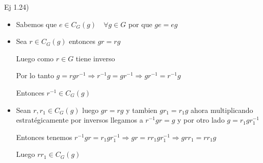\documentclass[12pt]{article}
\begin{document}
Ej 1.24) 
\begin{itemize}
  \item Sabemos que $e \in C_{G}(g) \quad \forall g \in G$ por que $ge = eg$
  \item  Sea $r \in C_{G}(g)$ entonces $gr = rg $ 

    Luego como $r \in G$ tiene inverso 

    Por lo tanto $g = rgr^{-1} \Rightarrow r^{-1}g =gr^{-1} \Rightarrow gr^{-1} = r^{-1}g$

    Entonces $r^{-1} \in C_{G}(g)$

  \item Sean $r,r_{1} \in C_{G}(g)$ luego $gr =rg$ y tambien $gr_{1} = r_{1}g$ ahora multiplicando estratégicamente por inversos llegamos a $r^{-1}gr = g$ y por otro lado $g = r_{1}gr_{1}^{-1}$

    Entonces tenemos $r^{-1}gr = r_{1}gr_{1}^{-1} \Rightarrow gr = r r_{1}gr_{1}^{-1} \Rightarrow grr_{1} = rr_{1}g $

    Luego $rr_{1} \in C_{G}(g)$
\end{itemize}
\end{document}
